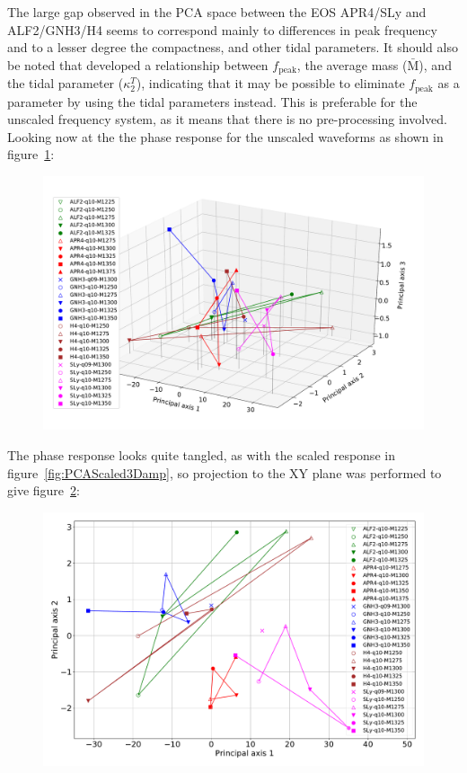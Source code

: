 The large gap observed in the PCA space between the EOS APR4/SLy and ALF2/GNH3/H4 seems to correspond mainly to differences in peak frequency and to a lesser degree the compactness, and other tidal parameters. It should also be noted that \cite{Bernuzzi2015} developed a relationship between $f_{\text{peak}}$, the average mass ($\bar{\text{M}}$), and the tidal parameter ($\kappa^T_2$), indicating that it may be possible to eliminate $f_{\text{peak}}$ as a parameter by using the tidal parameters instead. This is preferable for the unscaled frequency system, as it means that there is no pre-processing involved. Looking now at the  the phase response for the unscaled waveforms as shown in figure~\ref{fig:PCAUnscaled3Dphase}:
\begin{figure}[H]
	\centering
	\includegraphics[width=15cm]{./img/PCAUnscaled3Dphase.pdf} 
	\caption[\protect]{\protect}
	\label{fig:PCAUnscaled3Dphase}
\end{figure}
The phase response looks quite tangled, as with the scaled response in figure~\ref{fig:PCAScaled3Damp}, so projection to the XY plane was performed to give figure~\ref{fig:PCAUnscaled2Dphase}:
\begin{figure}[H]
	\centering
	\includegraphics[width=15cm]{./img/PCAUnscaled2Dphase.pdf} 
	\caption[\protect]{\protect}
	\label{fig:PCAUnscaled2Dphase}
\end{figure}
